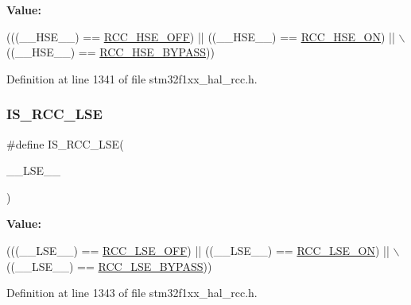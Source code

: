 {\bfseries Value\+:}
\begin{DoxyCode}
(((\_\_HSE\_\_) == \hyperlink{group___r_c_c___h_s_e___config_ga1616626d23fbce440398578855df6f97}{RCC\_HSE\_OFF}) || ((\_\_HSE\_\_) == \hyperlink{group___r_c_c___h_s_e___config_gabc4f70a44776c557af20496b04d9a9db}{RCC\_HSE\_ON}) || \(\backslash\)
                             ((\_\_HSE\_\_) == \hyperlink{group___r_c_c___h_s_e___config_ga5ca515db2d5c4d5bdb9ee3d154df2704}{RCC\_HSE\_BYPASS}))
\end{DoxyCode}


Definition at line 1341 of file stm32f1xx\+\_\+hal\+\_\+rcc.\+h.

\mbox{\label{group___r_c_c___private___macros_ga6c766af016cdc1d63f1ed64c5082737c}} 
\subsubsection{\texorpdfstring{I\+S\+\_\+\+R\+C\+C\+\_\+\+L\+SE}{IS\_RCC\_LSE}}
{\footnotesize\ttfamily \#define I\+S\+\_\+\+R\+C\+C\+\_\+\+L\+SE(\begin{DoxyParamCaption}\item[{}]{\+\_\+\+\_\+\+L\+S\+E\+\_\+\+\_\+ }\end{DoxyParamCaption})}

{\bfseries Value\+:}
\begin{DoxyCode}
(((\_\_LSE\_\_) == \hyperlink{group___r_c_c___l_s_e___config_ga6645c27708d0cad1a4ab61d2abb24c77}{RCC\_LSE\_OFF}) || ((\_\_LSE\_\_) == \hyperlink{group___r_c_c___l_s_e___config_gac981ea636c2f215e4473901e0912f55a}{RCC\_LSE\_ON}) || \(\backslash\)
                             ((\_\_LSE\_\_) == \hyperlink{group___r_c_c___l_s_e___config_gaad580157edbae878edbcc83c5a68e767}{RCC\_LSE\_BYPASS}))
\end{DoxyCode}


Definition at line 1343 of file stm32f1xx\+\_\+hal\+\_\+rcc.\+h.

\mbox{\label{group___r_c_c___private___macros_ga68584e3b585c1c1770d504a030d0dd34}} 
